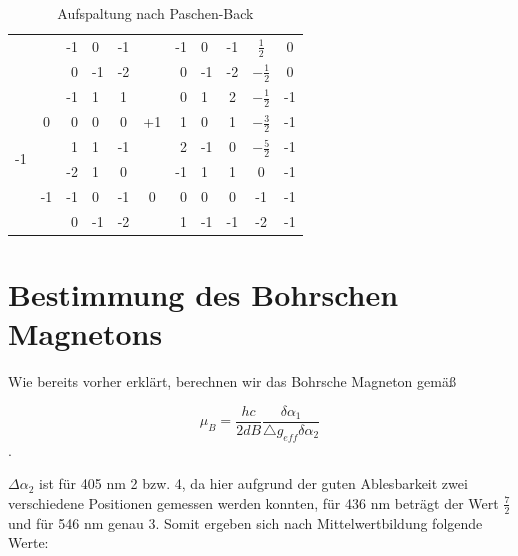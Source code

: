 \documentclass[bigchapter,colorback,accentcolor=tud4b,linedtoc,11pt]{tudreport}
\begin{document}
\begin{table}[H]
\begin{center}
\begin{tabular}{|c||c|r@{|}l|c||c|r@{|}l|c||c|c|}
                         &                     & -1    & 0     & -1              &                     & -1     & 0      & -1                & $\frac{1}{2}$  & 0           \\ 
                         &                     & 0     & -1    & -2              &                     & 0      & -1     & -2                & $-\frac{1}{2}$ & 0           \\ \hline
     \multirow{6}{*}{-1} & \multirow{3}{*}{0}  & -1    & 1     & 1               & \multirow{3}{*}{+1} & 0      & 1      & 2                 & $-\frac{1}{2}$ & -1          \\ 
                         &                     & 0     & 0     & 0               &                     & 1      & 0      & 1                 & $-\frac{3}{2}$ & -1          \\ 
                         &                     & 1     & 1     & -1              &                     & 2      & -1     & 0                 & $-\frac{5}{2}$ & -1          \\ \cline{2-11}
                         & \multirow{3}{*}{-1} & -2    & 1     & 0               & \multirow{3}{*}{0}  & -1     & 1      & 1                 & 0              & -1          \\ 
                         &                     & -1    & 0     & -1              &                     & 0      & 0      & 0                 & -1             & -1          \\ 
                         &                     & 0     & -1    & -2              &                     & 1      & -1     & -1                & -2             & -1          \\ \hline
    \end{tabular}
    \caption{Aufspaltung nach Paschen-Back}
  \end{center}
\end{table}

\section{Bestimmung des Bohrschen Magnetons}

Wie bereits vorher erklärt, berechnen wir das Bohrsche Magneton gemäß

$$\mu_{B}=\frac{hc}{2dB}\frac{\delta\alpha_{1}}{\triangle g_{eff}\delta\alpha_{2}}$$.

$\Delta \alpha_2$ ist für 405 nm 2 bzw. 4, da hier aufgrund der guten Ablesbarkeit zwei verschiedene Positionen gemessen werden konnten, für 436 nm beträgt der Wert $\frac{7}{2}$ und für 546 nm genau 3. Somit ergeben sich nach Mittelwertbildung folgende Werte:
\end{document}
